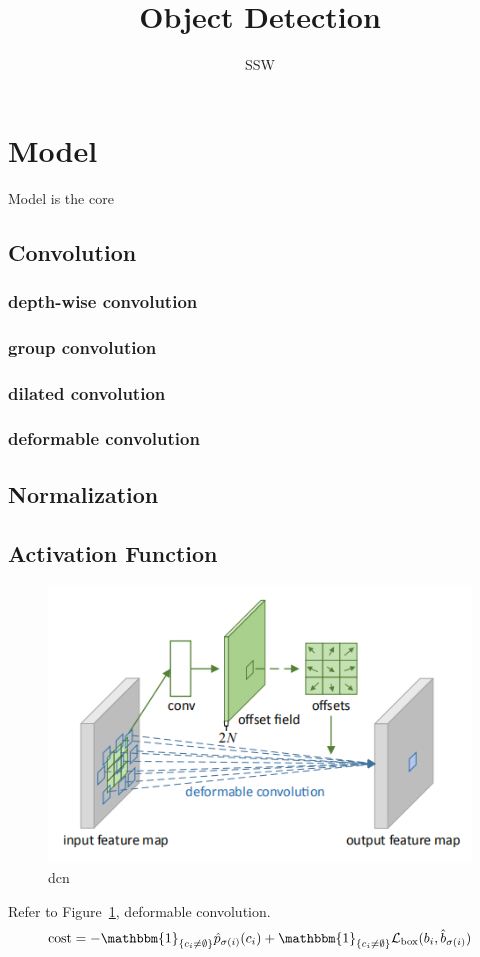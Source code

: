 \documentclass[a4paper]{article}
\title{Object Detection}
\author{SSW}
\begin{document}
\maketitle
\tableofcontents

\section{Model}
Model is the core
\subsection{Convolution}
\subsubsection{depth-wise convolution}
\subsubsection{group convolution}
\subsubsection{dilated convolution}
\subsubsection{deformable convolution}

\subsection{Normalization}

\subsection{Activation Function}


\begin{figure}[!h]
    \includegraphics[width=\linewidth]{dcn.png}
    \caption{dcn}\label{fig:dcn}
\end{figure}

Refer to Figure~\ref{fig:dcn}, deformable convolution.
\[
    \text{cost} = -\mathbbm{1}_{\{c_i \ne \emptyset\}} \hat{p}_{\sigma(i)}(c_i) + \mathbbm{1}_{\{c_i \ne \emptyset\}}\mathcal{L}_{\text{box}}(b_i, \hat{b}_{\sigma(i)})
\]
\end{document}
